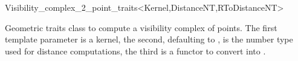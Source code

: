 
\begin{ccRefClass}{Visibility_complex_2_point_traits<Kernel,DistanceNT,RToDistanceNT>}

\ccDefinition

Geometric traits class to compute a visibility complex of points. The first
template parameter is a kernel, the second, defaulting to , is
the number type used for distance computations, the third is a functor to
convert  into .


\ccIsModel
{}

\ccSeeAlso

 \\
\\
\\

\ccTagDefaults
\end{ccRefClass}
\ccRefPageEnd

